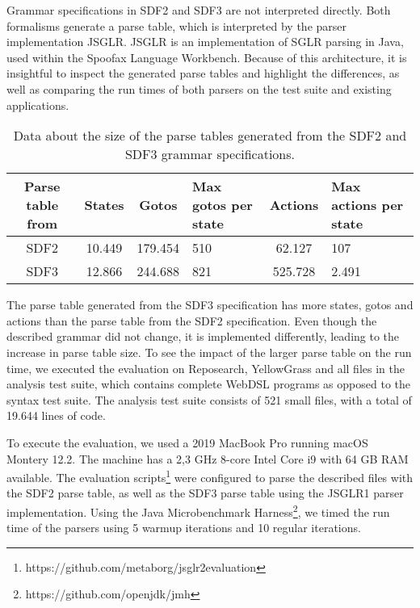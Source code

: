     Grammar specifications in SDF2 and SDF3 are not interpreted directly. Both formalisms generate a parse table, which is interpreted by the parser implementation JSGLR. JSGLR is an implementation of SGLR parsing in Java, used within the Spoofax Language Workbench. Because of this architecture, it is insightful to inspect the generated parse tables and highlight the differences, as well as comparing the run times of both parsers on the test suite and existing applications.

    \begin{table}[h]
      \centering
      \begin{tabular}{ |c||c | c | p{2cm} | c | p{2.2cm}| }
        \hline
        Parse table from & States & Gotos & Max gotos per state & Actions & Max actions per state \\
        \hline\hline
        SDF2 & 10.449 & 179.454 & 510 & 62.127 & 107 \\
        \hline
        SDF3 & 12.866 & 244.688 & 821 & 525.728 & 2.491 \\
        \hline
      \end{tabular}
      \caption{\label{tbl:parse-table-differences}Data about the size of the parse tables generated from the SDF2 and SDF3 grammar specifications.}
    \end{table}

    The parse table generated from the SDF3 specification has more states, gotos and actions than the parse table from the SDF2 specification. Even though the described grammar did not change, it is implemented differently, leading to the increase in parse table size. To see the impact of the larger parse table on the run time, we executed the evaluation on Reposearch, YellowGrass and all files in the analysis test suite, which contains complete WebDSL programs as opposed to the syntax test suite. The analysis test suite consists of 521 small files, with a total of 19.644 lines of code.

    To execute the evaluation, we used a 2019 MacBook Pro running macOS Montery 12.2. The machine has a 2,3 GHz 8-core Intel Core i9 with 64 GB RAM available. The evaluation scripts\footnote{https://github.com/metaborg/jsglr2evaluation} were configured to parse the described files with the SDF2 parse table, as well as the SDF3 parse table using the JSGLR1 parser implementation. Using the Java Microbenchmark Harness\footnote{https://github.com/openjdk/jmh}, we timed the run time of the parsers using 5 warmup iterations and 10 regular iterations.

